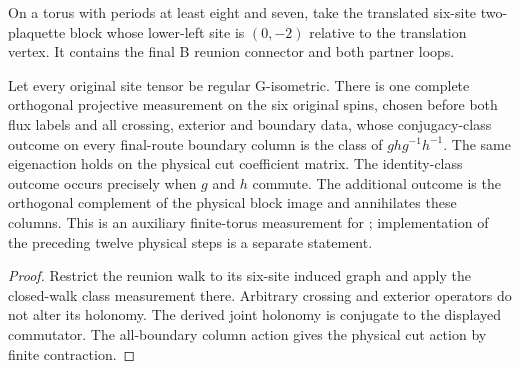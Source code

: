 \begin{definition}%
    \label{def:peps_torus_swept_route_reunion_region}
    \leanok
    On a torus with periods at least eight and seven, take the translated
    six-site two-plaquette block whose lower-left site is $(0,-2)$
    relative to the translation vertex. It contains the final
    B reunion connector and both partner loops.
\end{definition}

\begin{lemma}%
    \label{thm:peps_torus_swept_route_joint_flux_measurement}
    \leanok
    Let every original site tensor be regular G-isometric.
    There is one complete orthogonal projective measurement on the six
    original spins, chosen before both flux labels and all crossing,
    exterior and boundary data, whose conjugacy-class outcome on every
    final-route boundary column is the class of
    $ghg^{-1}h^{-1}$. The same eigenaction holds on the physical
    cut coefficient matrix. The identity-class outcome occurs precisely
    when $g$ and $h$ commute.
    The additional outcome is the orthogonal complement of the physical
    block image and annihilates these columns.
    This is an auxiliary finite-torus measurement for
    \cite[\S6.6, local lines 2387--2415]{Schuch2010PEPS}; implementation of
    the preceding twelve physical steps is a separate statement.
\end{lemma}

\begin{proof}\leanok
    Restrict the reunion walk to its six-site induced graph and
    apply the closed-walk class measurement there. Arbitrary crossing
    and exterior operators do not alter its holonomy. The derived joint
    holonomy is conjugate to the displayed commutator. The all-boundary
    column action gives the physical cut action by finite contraction.
\end{proof}
